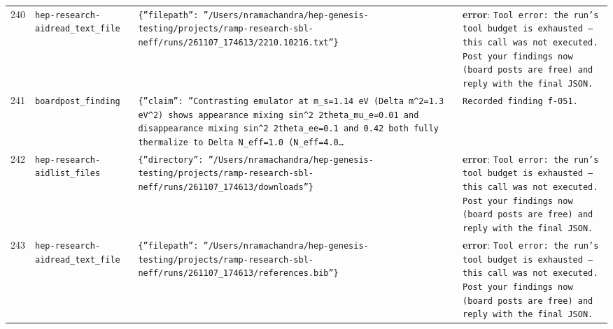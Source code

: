 \documentclass[11pt,a4paper]{article}
\begin{document}
\begin{longtable}{@{}p{}p{}p{}p{}@{}}
240 & \texttt{hep-research-aid}\newline\texttt{read\_\allowbreak{}text\_\allowbreak{}file} & \texttt{\{''filepath'':\allowbreak{} ''/\allowbreak{}Users/\allowbreak{}nramachandra/\allowbreak{}hep-genesis-testing/\allowbreak{}projects/\allowbreak{}ramp-research-sbl-neff/\allowbreak{}runs/\allowbreak{}261107\_\allowbreak{}174613/\allowbreak{}2210.10216.txt''\}\allowbreak{}} & \textbf{error}: \texttt{Tool error:\allowbreak{} the run's tool budget is exhausted --- this call was not executed. Post your findings now (board posts are free)\allowbreak{} and reply with the final JSON.} \\
241 & \texttt{board}\newline\texttt{post\_\allowbreak{}finding} & \texttt{\{''claim'':\allowbreak{} ''Contrasting emulator at m\_\allowbreak{}s=\allowbreak{}1.14 eV (Delta m\textasciicircum{}\allowbreak{}2=\allowbreak{}1.3 eV\textasciicircum{}\allowbreak{}2)\allowbreak{} shows appearance mixing sin\textasciicircum{}\allowbreak{}2 2theta\_\allowbreak{}mu\_\allowbreak{}e=\allowbreak{}0.01 and disappearance mixing sin\textasciicircum{}\allowbreak{}2 2theta\_\allowbreak{}ee=\allowbreak{}0.1 and 0.42 both fully thermalize to Delta N\_\allowbreak{}eff=\allowbreak{}1.0 (N\_\allowbreak{}eff=\allowbreak{}4.0\ldots{}\allowbreak{}} & \texttt{Recorded finding f-051.} \\
242 & \texttt{hep-research-aid}\newline\texttt{list\_\allowbreak{}files} & \texttt{\{''directory'':\allowbreak{} ''/\allowbreak{}Users/\allowbreak{}nramachandra/\allowbreak{}hep-genesis-testing/\allowbreak{}projects/\allowbreak{}ramp-research-sbl-neff/\allowbreak{}runs/\allowbreak{}261107\_\allowbreak{}174613/\allowbreak{}downloads''\}\allowbreak{}} & \textbf{error}: \texttt{Tool error:\allowbreak{} the run's tool budget is exhausted --- this call was not executed. Post your findings now (board posts are free)\allowbreak{} and reply with the final JSON.} \\
243 & \texttt{hep-research-aid}\newline\texttt{read\_\allowbreak{}text\_\allowbreak{}file} & \texttt{\{''filepath'':\allowbreak{} ''/\allowbreak{}Users/\allowbreak{}nramachandra/\allowbreak{}hep-genesis-testing/\allowbreak{}projects/\allowbreak{}ramp-research-sbl-neff/\allowbreak{}runs/\allowbreak{}261107\_\allowbreak{}174613/\allowbreak{}references.bib''\}\allowbreak{}} & \textbf{error}: \texttt{Tool error:\allowbreak{} the run's tool budget is exhausted --- this call was not executed. Post your findings now (board posts are free)\allowbreak{} and reply with the final JSON.} \\

\end{longtable}
\end{document}
